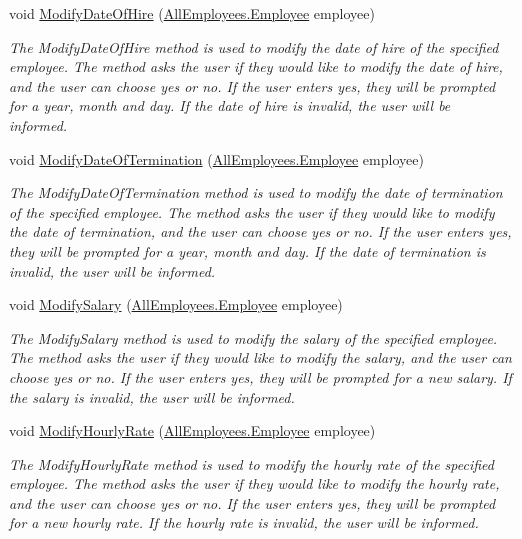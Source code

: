 \begin{DoxyCompactItemize}
void \hyperlink{class_the_company_1_1_container_a71dabc365c2d76f2d491a97cae615c7d}{Modify\+Date\+Of\+Hire} (\hyperlink{class_all_employees_1_1_employee}{All\+Employees.\+Employee} employee)
\begin{DoxyCompactList}\small\item\em The Modify\+Date\+Of\+Hire method is used to modify the date of hire of the specified employee. The method asks the user if they would like to modify the date of hire, and the user can choose yes or no. If the user enters yes, they will be prompted for a year, month and day. If the date of hire is invalid, the user will be informed. \end{DoxyCompactList}\item 
void \hyperlink{class_the_company_1_1_container_a2f5a129db55aa8d785ccfa6835ad3f29}{Modify\+Date\+Of\+Termination} (\hyperlink{class_all_employees_1_1_employee}{All\+Employees.\+Employee} employee)
\begin{DoxyCompactList}\small\item\em The Modify\+Date\+Of\+Termination method is used to modify the date of termination of the specified employee. The method asks the user if they would like to modify the date of termination, and the user can choose yes or no. If the user enters yes, they will be prompted for a year, month and day. If the date of termination is invalid, the user will be informed. \end{DoxyCompactList}\item 
void \hyperlink{class_the_company_1_1_container_a84f82419fadc0bf39f1bc7622b23f39b}{Modify\+Salary} (\hyperlink{class_all_employees_1_1_employee}{All\+Employees.\+Employee} employee)
\begin{DoxyCompactList}\small\item\em The Modify\+Salary method is used to modify the salary of the specified employee. The method asks the user if they would like to modify the salary, and the user can choose yes or no. If the user enters yes, they will be prompted for a new salary. If the salary is invalid, the user will be informed. \end{DoxyCompactList}\item 
void \hyperlink{class_the_company_1_1_container_a38b74f7d0fed04956c8b5360e194860b}{Modify\+Hourly\+Rate} (\hyperlink{class_all_employees_1_1_employee}{All\+Employees.\+Employee} employee)
\begin{DoxyCompactList}\small\item\em The Modify\+Hourly\+Rate method is used to modify the hourly rate of the specified employee. The method asks the user if they would like to modify the hourly rate, and the user can choose yes or no. If the user enters yes, they will be prompted for a new hourly rate. If the hourly rate is invalid, the user will be informed. \end{DoxyCompactList}\item 

\end{DoxyCompactItemize}
